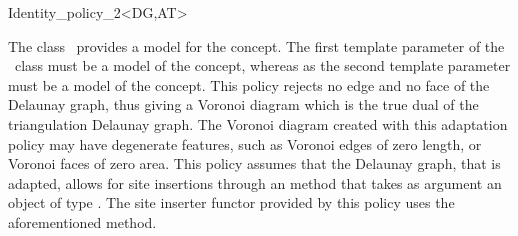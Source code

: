 

\begin{ccRefClass}{Identity_policy_2<DG,AT>}


\ccDefinition

The class \ccRefName\ provides a model for the 
concept. The first template parameter of the \ccRefName\ class must be a
model of the  concept, whereas as the second
template parameter must be a model of the  concept.
This policy rejects no edge and no face of the Delaunay graph, thus
giving a Voronoi diagram which is the true dual of the triangulation
Delaunay graph. The Voronoi diagram created with this adaptation
policy may have degenerate features, such as Voronoi edges of zero
length, or Voronoi faces of zero area. This policy assumes that the
Delaunay graph, that is adapted, allows for site insertions through an
 method that takes as argument an object of type
. The site inserter functor provided by this policy
uses the aforementioned  method.



\ccIsModel
{}

\ccTypes
{}

\ccSeeAlso
{}\\
\\
\end{ccRefClass}


